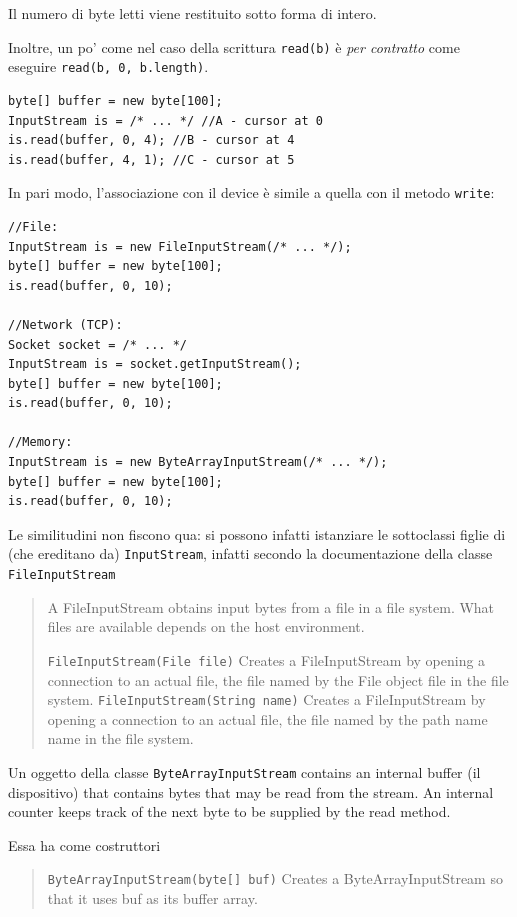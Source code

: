 \documentclass[\fontsizeclass,twocolumn]{\classname}
\theoremstyle{definition}
\theoremstyle{definition}
\begin{document}
Il numero di byte letti viene restituito sotto forma di intero.

Inoltre, un po' come nel caso della scrittura \texttt{read(b)} è \emph{per
contratto} come eseguire \texttt{read(b, 0, b.length)}.

\begin{lstlisting}
byte[] buffer = new byte[100];
InputStream is = /* ... */ //A - cursor at 0
is.read(buffer, 0, 4); //B - cursor at 4
is.read(buffer, 4, 1); //C - cursor at 5
\end{lstlisting}

In pari modo, l'associazione con il device è simile a quella con il metodo
\texttt{write}:

\begin{lstlisting}
//File:
InputStream is = new FileInputStream(/* ... */);
byte[] buffer = new byte[100];
is.read(buffer, 0, 10);

//Network (TCP):
Socket socket = /* ... */
InputStream is = socket.getInputStream();
byte[] buffer = new byte[100];
is.read(buffer, 0, 10);

//Memory:
InputStream is = new ByteArrayInputStream(/* ... */);
byte[] buffer = new byte[100];
is.read(buffer, 0, 10);
\end{lstlisting}

Le similitudini non fiscono qua: si possono infatti istanziare le sottoclassi
figlie di (che ereditano da) \texttt{Input\-Stream}, infatti secondo la
documentazione della classe \texttt{FileInputStream}

\begin{quote}
A FileInputStream obtains input bytes from a file in a file system. What files are available depends on the host environment.

\texttt{FileInputStream(File file)} 	Creates a FileInputStream by opening a connection to an actual file, the file named by the File object file in the file system.
\texttt{FileInputStream(String name)} 	Creates a FileInputStream by opening a connection to an actual file, the file named by the path name name in the file system.
\end{quote}

Un oggetto della classe \texttt{ByteArrayInputStream} {\footnotesize contains an
internal buffer} (il dispositivo) {\footnotesize that contains bytes that may be
read from the stream. An internal counter keeps track of the next byte to be
supplied by the read method.}

Essa ha come costruttori 

\begin{quote}
    \footnotesize{\texttt{ByteArrayInputStream(byte[] buf)} 	Creates a
    ByteArrayInputStream so that it uses buf as its buffer array.}
\end{quote}
\end{document}
